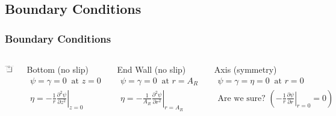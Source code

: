 \documentclass[compress]{beamer}
\begin{document}
\subsection{Boundary Conditions}

\begin{frame} \frametitle{Boundary Conditions}
\begin{columns}
\includegraphics[scale=0.8]{scheme.pdf}
\pause
\vspace{-6mm}
{\small
\begin{block}{Bottom (no slip)}
\vspace{-5mm}
\begin{align*}
\psi=\gamma=0~\text{ at } z=0\\
\eta=\left.-\frac{1}{r}\frac{\partial^2\psi}{\partial z^2}\right|_{z=0}
\end{align*}
\end{block}}
\pause
\vspace{-1mm}
{\small
\begin{block}{End Wall (no slip)}
\vspace{-5mm}
\begin{align*}
\psi=\gamma=0~\text{ at } r=A_R\\
\eta=\left.-\frac{1}{A_R}\frac{\partial^2\psi}{\partial r^2}\right|_{r=A_R}
\end{align*}
\end{block}}
\pause
\vspace{-1mm}
{\small
\begin{block}{Axis (symmetry)}
\vspace{-5mm}
\begin{align*}
\psi=\gamma=\eta=0~\text{ at } r=0\\
\text{Are we sure?  }
\left(\left.-\frac{1}{r}\frac{\partial\psi}{\partial r}\right|_{r=0}= 0\right)
\end{align*}
\end{block}}
\end{columns}
\end{frame}
\end{document}
